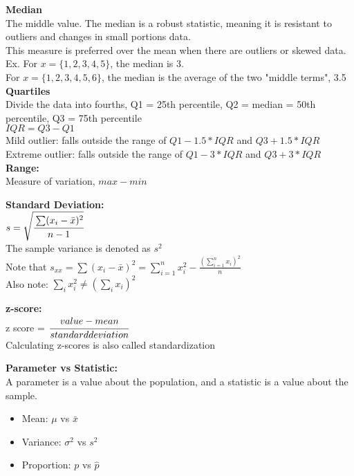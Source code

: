 \documentclass[12pt]{article}
\begin{document}
\noindent \textbf{Median} \\
The middle value. The median is a robust statistic, meaning it is resistant to outliers and changes in small portions data. \\
\noindent This measure is preferred over the mean when there are outliers or skewed data. \\
Ex. For $x=\{1,2,3,4,5\}$, the median is 3. \\
\indent \hspace{5pt}For $x=\{1,2,3,4,5,6\}$, the median is the average of the two "middle terms", 3.5 \\

\noindent \textbf{Quartiles} \\
Divide the data into fourths, Q1 = 25th percentile, Q2 = median = 50th percentile, Q3 = 75th percentile \\
$IQR = Q3 - Q1$ \\
Mild outlier: falls outside the range of $Q1-1.5*IQR$ and $Q3+1.5*IQR$ \\
Extreme outlier: falls outside the range of $Q1-3*IQR$ and $Q3+3*IQR$ \\

\noindent \textbf{Range:}\\
Measure of variation,  
$max - min$

\noindent \textbf{Standard Deviation:} \\
\vspace{5mm}
$s=\sqrt{\cfrac{\sum(x_{i}-\bar{x})^{2}}{n-1}}$\\
The sample variance is denoted as $s^{2}$ \\
Note that $s_{xx} = \sum(x_{i}-\bar{x})^{2} = \sum_{i = 1}^n x_{i}^2-\frac{(\sum_{i=1}^nx_i)^2}{n}$  \\
Also note: $\sum_i x_i^2 \neq (\sum_i x_i)^2$

\noindent\textbf{z-score:} \\
\noindent z score = $\cfrac{value-mean}{standard deviation}$ \\

\noindent Calculating z-scores is also called standardization

\noindent \textbf{Parameter vs Statistic:} \\
A parameter is a value about the population, and a statistic is a value about the sample.
\begin{itemize}
\item Mean: $\mu$ vs $\bar{x}$
\item Variance: $\sigma^{2}$ vs $s^{2}$
\item Proportion: $p$ vs $\hat{p}$
\end{itemize}
\end{document}
